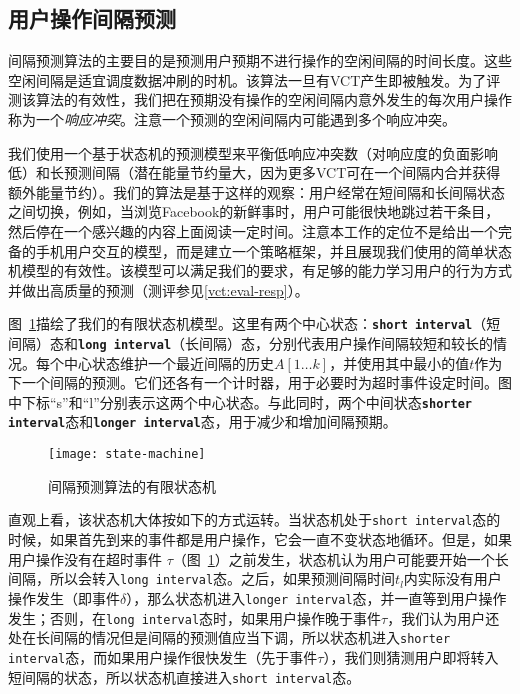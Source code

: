 \subsection{用户操作间隔预测}
\label{vct:interval}

间隔预测算法的主要目的是预测用户预期不进行操作的空闲间隔的时间长度。这些空闲间隔是适宜调度数据冲刷的时机。该算法一旦有VCT产生即被触发。为了评测该算法的有效性，我们把在预期没有操作的空闲间隔内意外发生的每次用户操作称为一个\emph{响应冲突}。注意一个预测的空闲间隔内可能遇到多个响应冲突。 
 
我们使用一个基于状态机的预测模型来平衡低响应冲突数（对响应度的负面影响低）和长预测间隔（潜在能量节约量大，因为更多VCT可在一个间隔内合并获得额外能量节约）。我们的算法是基于这样的观察：用户经常在短间隔和长间隔状态之间切换，例如，当浏览Facebook的新鲜事时，用户可能很快地跳过若干条目，然后停在一个感兴趣的内容上面阅读一定时间。注意本工作的定位不是给出一个完备的手机用户交互的模型，而是建立一个策略框架，并且展现我们使用的简单状态机模型的有效性。该模型可以满足我们的要求，有足够的能力学习用户的行为方式并做出高质量的预测（测评参见\ref{vct:eval-resp}）。

图~\ref{fig-state-machine}描绘了我们的有限状态机模型。这里有两个中心状态：\textbf{\texttt{short interval}}（短间隔）态和\texttt{\textbf{long interval}}（长间隔）态，分别代表用户操作间隔较短和较长的情况。每个中心状态维护一个最近间隔的历史$A[1\ldots k]$，并使用其中最小的值$t$作为下一个间隔的预测。它们还各有一个计时器，用于必要时为超时事件设定时间。图中下标“s”和“l”分别表示这两个中心状态。与此同时，两个中间状态\texttt{\textbf{shorter interval}}态和\texttt{\textbf{longer
interval}}态，用于减少和增加间隔预期。

\begin{figure}[!h]
  \centering
  \texttt{[image: state-machine]}
  \caption{间隔预测算法的有限状态机}
  \label{fig-state-machine}
\end{figure}

直观上看，该状态机大体按如下的方式运转。当状态机处于\texttt{short interval}态的时候，如果首先到来的事件都是用户操作，它会一直不变状态地循环。但是，如果用户操作没有在超时事件
$\tau$（图~\ref{fig-state-machine}）之前发生，状态机认为用户可能要开始一个长间隔，所以会转入\texttt{long interval}态。之后，如果预测间隔时间$t_l$内实际没有用户操作发生（即事件$\delta$），那么状态机进入\texttt{longer interval}态，并一直等到用户操作发生；否则，在\texttt{long interval}态时，如果用户操作晚于事件$\tau$，我们认为用户还处在长间隔的情况但是间隔的预测值应当下调，所以状态机进入\texttt{shorter interval}态，而如果用户操作很快发生（先于事件$\tau$），我们则猜测用户即将转入短间隔的状态，所以状态机直接进入\texttt{short interval}态。


